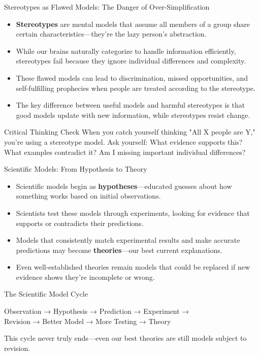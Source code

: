 \documentclass{beamer}
\begin{document}
	\begin{frame}{Stereotypes as Flawed Models: The Danger of Over-Simplification}
		\begin{itemize}
			\item \textbf{Stereotypes} are mental models that assume all members of a group share certain characteristics—they're the lazy person's abstraction.
			\item While our brains naturally categorize to handle information efficiently, stereotypes fail because they ignore individual differences and complexity.
			\item These flawed models can lead to discrimination, missed opportunities, and self-fulfilling prophecies when people are treated according to the stereotype.
			\item The key difference between useful models and harmful stereotypes is that good models update with new information, while stereotypes resist change.
		\end{itemize}
		
		\begin{alertblock}{Critical Thinking Check}
			\scriptsize
			When you catch yourself thinking "All X people are Y," you're using a stereotype model. Ask yourself: What evidence supports this? What examples contradict it? Am I missing important individual differences?
		\end{alertblock}
	\end{frame}
	
	\begin{frame}{Scientific Models: From Hypothesis to Theory}
		\begin{itemize}
			\item Scientific models begin as \textbf{hypotheses}—educated guesses about how something works based on initial observations.
			\item Scientists test these models through experiments, looking for evidence that supports or contradicts their predictions.
			\item Models that consistently match experimental results and make accurate predictions may become \textbf{theories}—our best current explanations.
			\item Even well-established theories remain models that could be replaced if new evidence shows they're incomplete or wrong.
		\end{itemize}
		
		\begin{block}{The Scientific Model Cycle}
			\begin{center}
				Observation → Hypothesis → Prediction → Experiment → \\
				Revision → Better Model → More Testing → Theory
			\end{center}
			This cycle never truly ends—even our best theories are still models subject to revision.
		\end{block}
	\end{frame}
	
\end{document}
